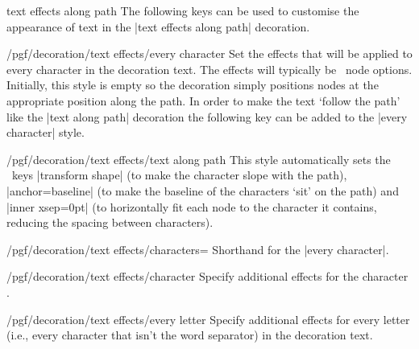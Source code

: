 \begin{decoration}{text effects along path}
    The following keys can be used to customise the
    appearance of text in the |text effects along path|
    decoration.

    \begin{stylekey}{/pgf/decoration/text effects/every character}
        Set the effects that will be applied to every character in the
        decoration text. The effects will typically be \tikzname\ node options.
        Initially, this style is empty so the decoration simply positions nodes
        at the appropriate position along the path. In order to make the text
        `follow the path' like the |text along path| decoration the following
        key can be added to the |every character| style.
    \end{stylekey}

    \begin{stylekey}{/pgf/decoration/text effects/text along path}
        This style automatically sets the \tikzname\ keys |transform shape| (to
        make the character slope with the path), |anchor=baseline| (to make the
        baseline of the characters `sit' on the path) and |inner xsep=0pt| (to
        horizontally fit each node to the character it contains, reducing the
        spacing between characters).
\begin{codeexample}[]
\end{codeexample}
    \end{stylekey}

    \begin{key}{/pgf/decoration/text effects/characters=}
        Shorthand for the |every character|.
    \end{key}

    \begin{stylekey}{/pgf/decoration/text effects/character }
        Specify additional effects for the character .
    \end{stylekey}

    \begin{stylekey}{/pgf/decoration/text effects/every letter}
        Specify additional effects for every letter (i.e., every character that
        isn't the word separator) in the decoration text.
    \end{stylekey}


\end{decoration}
